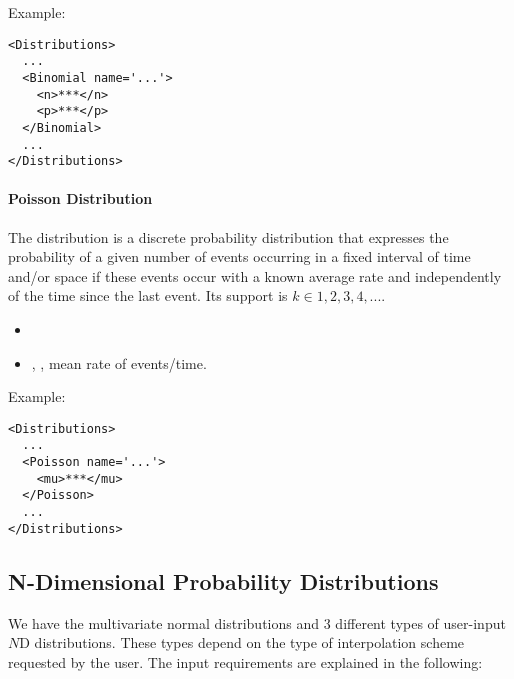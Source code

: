 Example:
\begin{lstlisting}[style=XML]
<Distributions>
  ...
  <Binomial name='...'>
    <n>***</n>
    <p>***</p>
  </Binomial>
  ...
</Distributions>
\end{lstlisting}

\paragraph{Poisson Distribution}
\label{Poisson}
The  distribution is a discrete probability distribution that
expresses the probability of a given number of events occurring in a fixed
interval of time and/or space if these events occur with a known average rate
and independently of the time since the last event.
%
Its support is $k \in {1, 2, 3, 4, ...}$.

%
\attrIntro
\vspace{-5mm}
\begin{itemize}
\itemsep0em
\item \nameDescription   
\end{itemize}
\vspace{-5mm}
\subnodeIntro
\begin{itemize}
\item {}, , mean rate of 
  events/time.
\end{itemize}

Example:
\begin{lstlisting}[style=XML]
<Distributions>
  ...
  <Poisson name='...'>
    <mu>***</mu>
  </Poisson>
  ...
</Distributions>
\end{lstlisting}

\subsection{N-Dimensional Probability Distributions}
\label{subsec:NdDist}
We have the multivariate normal distributions and 3 different types of 
user-input $N$D distributions.
%
These types depend on the type of interpolation scheme requested by the user.
The input requirements are explained in the following:



